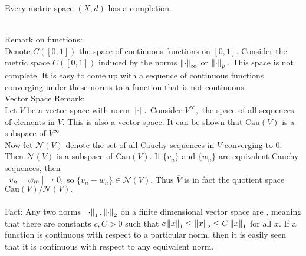 \begin{thm}
Every metric space $(X,d)$ has a completion. \\ \\
\end{thm}

\noindent Remark on functions:\\
Denote $C([0,1])$ the space of continuous functions on $[0,1].$ Consider the metric space $C([0,1])$ induced by the norms $\left\lVert\cdot\right\rVert_{\infty}$ or $\left\lVert\cdot\right\rVert_p.$ This space is not complete. It is easy to come up with a sequence of continuous functions converging under these norms to a function that is not continuous. \\

\noindent Vector Space Remark: \\
Let $V$ be a vector space with norm $\left\lVert\cdot\right\rVert.$ Consider $V^{\infty},$ the space of all sequences of elements in $V.$ This is also a vector space. It can be shown that $\text{Cau}(V)$ is a subspace of $V^{\infty}.$ \\
Now let $\mathcal{N}(V)$ denote the set of all Cauchy sequences in $V$ converging to $0.$ Then $\mathcal{N}(V)$ is a subspace of $\text{Cau}(V).$ If $\{v_n\}$ and $\{w_n\}$ are equivalent Cauchy sequences, then \\ $\left\lVert v_n-w_m\right\rVert\rightarrow 0,$ so $\{v_n-w_n\}\in\mathcal{N}(V).$ Thus $\overline{V}$ is in fact the quotient space $\text{Cau}(V)/\mathcal{N}(V).$ \\ \\
Fact: Any two norms $\left\lVert\cdot\right\rVert_1,\left\lVert\cdot\right\rVert_2$ on a finite dimensional vector space are , meaning that there are constants $c,C>0$ such that $c\left\lVert x\right\rVert_1\leq\left\lVert x\right\rVert_2\leq C\left\lVert x\right\rVert_1$ for all $x.$ If a function is continuous with respect to a particular norm, then it is easily seen that it is continuous with respect to any equivalent norm.

